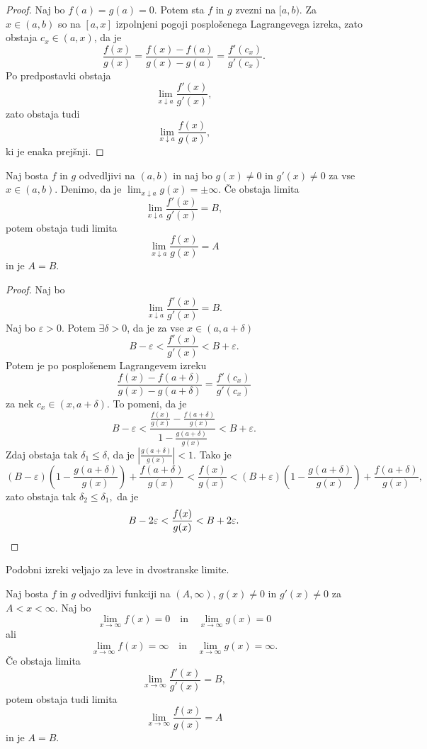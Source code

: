 \documentclass[12pt, a4paper]{article}
\begin{document}
\begin{proof}
Naj bo $f(a)=g(a)=0$. Potem sta $f$ in $g$ zvezni na $[a,b)$. Za $x\in(a,b)$ so na $[a,x]$ izpolnjeni pogoji posplošenega Lagrangevega izreka, zato obstaja $c_x\in(a,x)$, da je
\[
\frac{f(x)}{g(x)}=\frac{f(x)-f(a)}{g(x)-g(a)}=\frac{f'(c_x)}{g'(c_x)}.
\]
Po predpostavki obstaja
\[
\lim_{x\downarrow a}\frac{f'(x)}{g'(x)},
\]
zato obstaja tudi
\[
\lim_{x\downarrow a}\frac{f(x)}{g(x)},
\]
ki je enaka prejšnji.
\end{proof}

\begin{izrek}
Naj bosta $f$ in $g$ odvedljivi na $(a,b)$ in naj bo $g(x)\ne 0$ in $g'(x)\ne 0$ za vse $x\in(a,b)$. Denimo, da je $\displaystyle\lim_{x\downarrow a}g(x)=\pm\infty$. Če obstaja limita
\[
\lim_{x\downarrow a}\frac{f'(x)}{g'(x)}=B,
\]
potem obstaja tudi limita
\[
\lim_{x\downarrow a}\frac{f(x)}{g(x)}=A
\]
in je $A=B$.
\end{izrek}

\begin{proof}
Naj bo
\[
\lim_{x\downarrow a}\frac{f'(x)}{g'(x)}=B.
\]
Naj bo $\varepsilon>0$. Potem $\exists\delta>0$, da je za vse $x\in(a,a+\delta)$
\[
B-\varepsilon<\frac{f'(x)}{g'(x)}<B+\varepsilon.
\]
Potem je po posplošenem Lagrangevem izreku
\[
\frac{f(x)-f(a+\delta)}{g(x)-g(a+\delta)}=\frac{f'(c_x)}{g'(c_x)}
\]
za nek $c_x\in(x,a+\delta)$. To pomeni, da je
\[
B-\varepsilon<\frac{\frac{f(x)}{g(x)}-\frac{f(a+\delta)}{g(x)}}{1-\frac{g(a+\delta)}{g(x)}}<B+\varepsilon.
\]
Zdaj obstaja tak $\delta_1\leq\delta$, da je $\left|\frac{g(a+\delta)}{g(x)}\right|<1$. Tako je
\[
(B-\varepsilon)\left(1-\frac{g(a+\delta)}{g(x)}\right)+\frac{f(a+\delta)}{g(x)}<\frac{f(x)}{g(x)}<(B+\varepsilon)\left(1-\frac{g(a+\delta)}{g(x)}\right)+\frac{f(a+\delta)}{g(x)},
\]
zato obstaja tak $\delta_2\leq\delta_1,$ da je
\[
B-2\varepsilon<\frac{f(x)}{g(x)}<B+2\varepsilon.\qedhere
\]
\end{proof}

\begin{opomba}
Podobni izreki veljajo za leve in dvostranske limite.
\end{opomba}

\begin{trditev}
Naj bosta $f$ in $g$ odvedljivi funkciji na $(A,\infty)$, $g(x)\ne 0$ in $g'(x)\ne 0$  za $A<x<\infty$. Naj bo
\[
\lim_{x\to\infty}f(x)=0\quad\text{in}\quad\lim_{x\to\infty}g(x)=0
\]
ali
\[
\lim_{x\to\infty}f(x)=\infty\quad\text{in}\quad\lim_{x\to\infty}g(x)=\infty.
\]
Če obstaja limita
\[
\lim_{x\to\infty}\frac{f'(x)}{g'(x)}=B,
\]
potem obstaja tudi limita
\[
\lim_{x\to\infty}\frac{f(x)}{g(x)}=A
\]
in je $A=B$.
\end{trditev}
\end{document}
